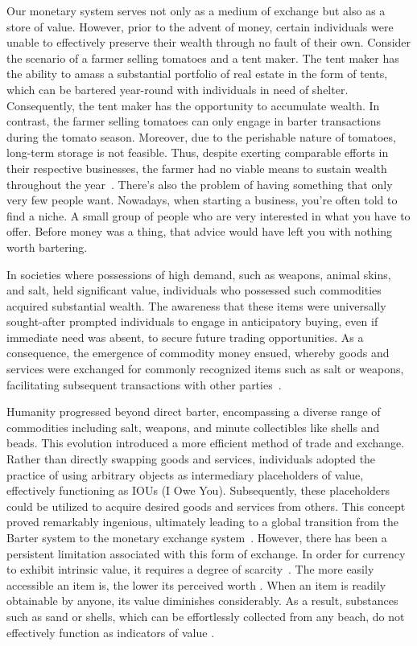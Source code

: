 Our monetary system serves not only as a medium of exchange but also as a store of value. However, prior to the advent of money, certain
individuals were unable to effectively preserve their wealth through no fault of their own. Consider the scenario of a farmer selling tomatoes
and a tent maker. The tent maker has the ability to amass a substantial portfolio of real estate in the form of tents, which can be bartered
year-round with individuals in need of shelter. Consequently, the tent maker has the opportunity to accumulate wealth. In contrast, the farmer
selling tomatoes can only engage in barter transactions during the tomato season. Moreover, due to the perishable nature of tomatoes, long-term
storage is not feasible. Thus, despite exerting comparable efforts in their respective businesses, the farmer had no viable means to sustain
wealth throughout the year~\cite{de2016origins}. There's also the problem of having something that only very few people want. Nowadays,
when starting a business, you're often told to find a niche. A small group of people who are very interested in what you have to offer. Before
money was a thing, that advice would have left you with nothing worth bartering.

In societies where possessions of high demand, such as weapons, animal skins, and salt, held significant value, individuals who possessed
such commodities acquired substantial wealth. The awareness that these items were universally sought-after prompted individuals to engage in
anticipatory buying, even if immediate need was absent, to secure future trading opportunities. As a consequence, the emergence of commodity
money ensued, whereby goods and services were exchanged for commonly recognized items such as salt or weapons, facilitating subsequent
transactions with other parties~\cite{polanyi1965trade}.

Humanity progressed beyond direct barter, encompassing a diverse range of commodities including salt, weapons, and minute collectibles like
shells and beads. This evolution introduced a more efficient method of trade and exchange. Rather than directly swapping goods and services,
individuals adopted the practice of using arbitrary objects as intermediary placeholders of value, effectively functioning as IOUs (I Owe You).
Subsequently, these placeholders could be utilized to acquire desired goods and services from others. This concept proved remarkably ingenious,
ultimately leading to a global transition from the Barter system to the monetary exchange system~\cite{graeber2012debt}. However, there has
been a persistent limitation associated with this form of exchange. In order for currency to exhibit intrinsic value, it requires a degree of
scarcity~\cite{smith2010wealth, ricardo1821principles}. The more easily accessible an item is, the lower its perceived worth
\cite{marshall2009principles}. When an item is readily obtainable by anyone, its value diminishes considerably. As a result, substances such
as sand or shells, which can be effortlessly collected from any beach, do not effectively function as indicators of value
\cite{principlesmenger, hicks1936keynes}.


